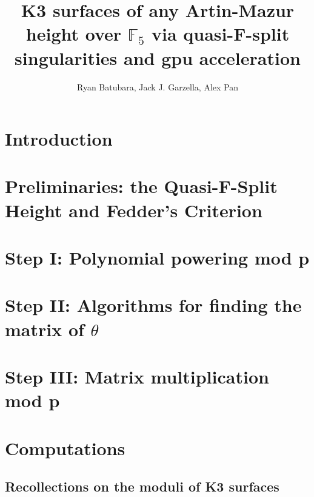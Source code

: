 \documentclass[a4paper]{article}
\title{K3 surfaces of any Artin-Mazur height over \(\mathbb{F}_{5}\) via quasi-F-split singularities and gpu acceleration}
\author{Ryan Batubara, Jack J. Garzella, Alex Pan}
\begin{document}
\maketitle

\section{Introduction}



\section{Preliminaries: the Quasi-F-Split Height and Fedder's Criterion}



\section{Step I: Polynomial powering mod p}



\section{Step II: Algorithms for finding the matrix of \(\theta\)}



\section{Step III: Matrix multiplication mod p}



\section{Computations}

\subsection{Recollections on the moduli of K3 surfaces}







\end{document}

